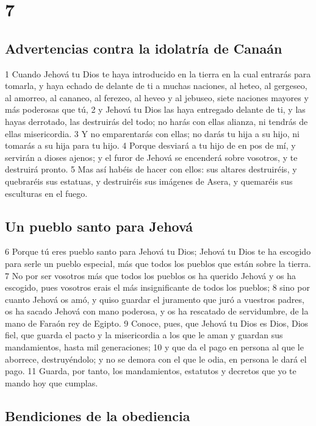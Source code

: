 \chapter{7}

\section{Advertencias contra la idolatría de Canaán }

1 Cuando Jehová tu Dios te haya introducido en la tierra en la cual entrarás para tomarla, y haya echado de delante de ti a muchas naciones, al heteo, al gergeseo, al amorreo, al cananeo, al ferezeo, al heveo y al jebuseo, siete naciones mayores y más poderosas que tú,
2 y Jehová tu Dios las haya entregado delante de ti, y las hayas derrotado, las destruirás del todo; no harás con ellas alianza, ni tendrás de ellas misericordia.
3 Y no emparentarás con ellas; no darás tu hija a su hijo, ni tomarás a su hija para tu hijo.
4 Porque desviará a tu hijo de en pos de mí, y servirán a dioses ajenos; y el furor de Jehová se encenderá sobre vosotros, y te destruirá pronto.
5 Mas así habéis de hacer con ellos: sus altares destruiréis, y quebraréis sus estatuas, y destruiréis sus imágenes de Asera, y quemaréis sus esculturas en el fuego.

\section{Un pueblo santo para Jehová}

6 Porque tú eres pueblo santo para Jehová tu Dios; Jehová tu Dios te ha escogido para serle un pueblo especial, más que todos los pueblos que están sobre la tierra.
7 No por ser vosotros más que todos los pueblos os ha querido Jehová y os ha escogido, pues vosotros erais el más insignificante de todos los pueblos;
8 sino por cuanto Jehová os amó, y quiso guardar el juramento que juró a vuestros padres, os ha sacado Jehová con mano poderosa, y os ha rescatado de servidumbre, de la mano de Faraón rey de Egipto.
9 Conoce, pues, que Jehová tu Dios es Dios, Dios fiel, que guarda el pacto y la misericordia a los que le aman y guardan sus mandamientos, hasta mil generaciones;
10 y que da el pago en persona al que le aborrece, destruyéndolo; y no se demora con el que le odia, en persona le dará el pago.
11 Guarda, por tanto, los mandamientos, estatutos y decretos que yo te mando hoy que cumplas.

\section{Bendiciones de la obediencia }

